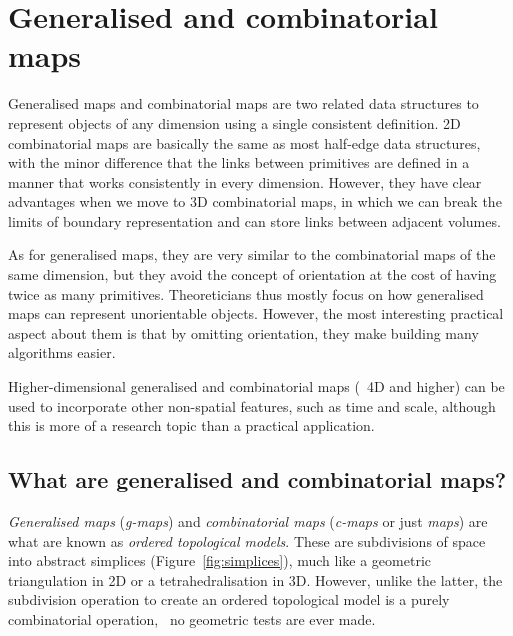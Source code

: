 
\setchapterpreamble[u]{\margintoc}

\graphicspath{{gmaps/}}
\renewcommand*{\thelesson}{5.1}

\chapter{Generalised and combinatorial maps}%
\label{chap:gmaps}

Generalised maps and combinatorial maps are two related data structures to represent objects of any dimension using a single consistent definition.
2D combinatorial maps are basically the same as most half-edge data structures, with the minor difference that the links between primitives are defined in a manner that works consistently in every dimension.
However, they have clear advantages when we move to 3D combinatorial maps, in which we can break the limits of boundary representation and can store links between adjacent volumes.

As for generalised maps, they are very similar to the combinatorial maps of the same dimension, but they avoid the concept of orientation at the cost of having twice as many primitives.
Theoreticians thus mostly focus on how generalised maps can represent unorientable objects.
However, the most interesting practical aspect about them is that by omitting orientation, they make building many algorithms easier.

Higher-dimensional generalised and combinatorial maps (\ie\ 4D and higher) can be used to incorporate other non-spatial features, such as time and scale, although this is more of a research topic than a practical application.

\section{What are generalised and combinatorial maps?}

\emph{Generalised maps} (\emph{g-maps}) and \emph{combinatorial maps} (\emph{c-maps} or just \emph{maps}) are what are known as \emph{ordered topological models}.
These are subdivisions of space into abstract simplices (Figure~\ref{fig:simplices}), much like a geometric triangulation in 2D or a tetrahedralisation in 3D.
However, unlike the latter, the subdivision operation to create an ordered topological model is a purely combinatorial operation, \ie\ no geometric tests are ever made.

